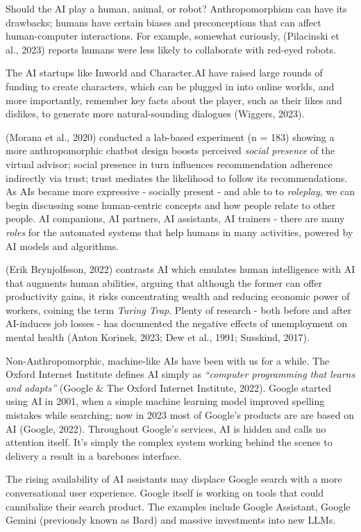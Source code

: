 \documentclass[
  letterpaper,
  DIV=11,
  numbers=noendperiod]{scrartcl}
\begin{document}
Should the AI play a human, animal, or robot? Anthropomorphism can have
its drawbacks; humans have certain biases and preconceptions that can
affect human-computer interactions. For example, somewhat curiously,
(Pilacinski et al., 2023) reports humans were less likely to collaborate
with red-eyed robots.

The AI startups like Inworld and Character.AI have raised large rounds
of funding to create characters, which can be plugged in into online
worlds, and more importantly, remember key facts about the player, such
as their likes and dislikes, to generate more natural-sounding dialogues
(Wiggers, 2023).

(Morana et al., 2020) conducted a lab-based experiment (n = 183) showing
a more anthropomorphic chatbot design boosts perceived \emph{social
presence} of the virtual advisor; social presence in turn influences
recommendation adherence indirectly via trust; trust mediates the
likelihood to follow its recommendations. As AIs became more expressive
- socially present - and able to to \emph{roleplay}, we can begin
discussing some human-centric concepts and how people relate to other
people. AI companions, AI partners, AI assistants, AI trainers - there
are many \emph{roles} for the automated systems that help humans in many
activities, powered by AI models and algorithms.

(Erik Brynjolfsson, 2022) contrasts AI which emulates human intelligence
with AI that augments human abilities, arguing that although the former
can offer productivity gains, it risks concentrating wealth and reducing
economic power of workers, coining the term \emph{Turing Trap}. Plenty
of research - both before and after AI-induces job losses - has
documented the negative effects of unemployment on mental health (Anton
Korinek, 2023; Dew et al., 1991; Susskind, 2017).

Non-Anthropomorphic, machine-like AIs have been with us for a while. The
Oxford Internet Institute defines AI simply as \emph{``computer
programming that learns and adapts''} (Google \& The Oxford Internet
Institute, 2022). Google started using AI in 2001, when a simple machine
learning model improved spelling mistakes while searching; now in 2023
most of Google's products are are based on AI (Google, 2022). Throughout
Google's services, AI is hidden and calls no attention itself. It's
simply the complex system working behind the scenes to delivery a result
in a barebones interface.

The rising availability of AI assistants may displace Google search with
a more conversational user experience. Google itself is working on tools
that could cannibalize their search product. The examples include Google
Assistant, Google Gemini (previously known as Bard) and massive
investments into new LLMs.
\end{document}
